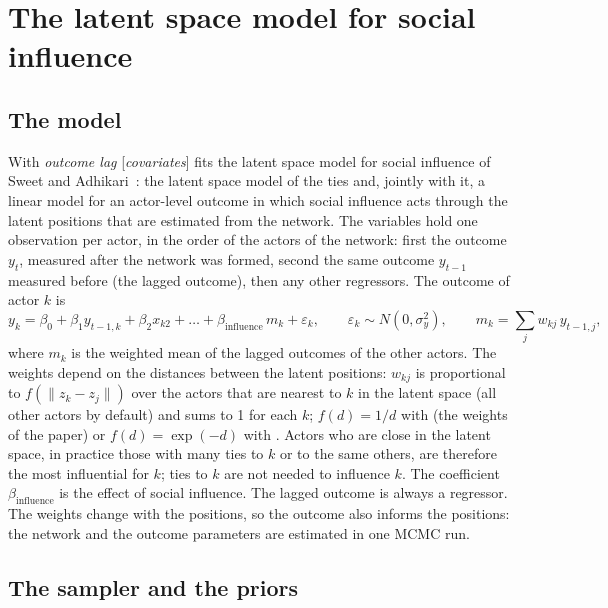 \chapter{The latent space model for social influence}\label{ch:influence}

\section{The model}

With \emph{outcome lag} [\emph{covariates}]\opt{)} \nwlsm{} fits the latent space model for social influence of Sweet and Adhikari~\cite{sweet2020}: the latent space model of the ties and, jointly with it, a linear model for an actor-level outcome in which social influence acts through the latent positions that are estimated from the network. The variables hold one observation per actor, in the order of the actors of the network: first the outcome $y_t$, measured after the network was formed, second the same outcome $y_{t-1}$ measured before (the lagged outcome), then any other regressors. The outcome of actor $k$ is
\begin{equation}
y_k=\beta_0+\beta_1y_{t-1,k}+\beta_2x_{k2}+\dots+\beta_{\text{influence}}\,m_k+\varepsilon_k,\qquad \varepsilon_k\sim N(0,\sigma_y^2),\qquad m_k=\sum_jw_{kj}\,y_{t-1,j},
\end{equation}
where $m_k$ is the weighted mean of the lagged outcomes of the other actors. The weights depend on the distances between the latent positions: $w_{kj}$ is proportional to $f(\lVert z_k-z_j\rVert)$ over the  actors that are nearest to $k$ in the latent space (all other actors by default) and sums to 1 for each $k$; $f(d)=1/d$ with  (the weights of the paper) or $f(d)=\exp(-d)$ with . Actors who are close in the latent space, in practice those with many ties to $k$ or to the same others, are therefore the most influential for $k$; ties to $k$ are not needed to influence $k$. The coefficient $\beta_{\text{influence}}$ is the effect of social influence. The lagged outcome is always a regressor. The weights change with the positions, so the outcome also informs the positions: the network and the outcome parameters are estimated in one MCMC run.

\section{The sampler and the priors}

